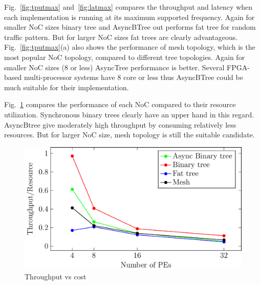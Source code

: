 Fig.~\ref{fig:tputmax} and~\ref{fig:latmax} compares the throughput and latency when each implementation is running at its maximum supported frequency.
Again for smaller NoC sizes binary tree and AsyncBTree out performs fat tree for random traffic pattern.
But for larger NoC sizes fat trees are clearly advantageous.
Fig.~\ref{fig:tputmax}(a) also shows the performance of mesh topology, which is the most popular NoC topology, compared to different tree topologies.
Again for smaller NoC sizes (8 or less) AsyncTree performance is better.
Several FPGA-based multi-processor systems have 8 core or less thus AsyncBTree could be much suitable for their implementation.

Fig.~\ref{fig:tputPerf} compares the performance of each NoC compared to their resource utilization.
Synchronous binary trees clearly have an upper hand in this regard.
AsyncBtree give moderately high throughput by consuming relatively less resources.
But for larger NoC size, mesh topology is still the suitable candidate.


\begin{figure}[t]
\centering
   \includegraphics[width=0.6\columnwidth]{Data/tputVsCost.pdf}
         \vspace{-2mm}
   \caption{Throughput vs cost}
      \vspace{-5mm}
      \label{fig:tputPerf}
\end{figure}

